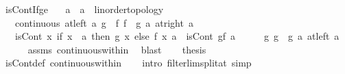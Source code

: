 \begin{isabellebody}
%
\endisadelimproof
%
\isadelimdocument
%
\endisadelimdocument
%
\isatagdocument
%
\isamarkuptrue%
%
\endisatagdocument
{\isafolddocument}%
%
\isadelimdocument
%
\endisadelimdocument
{}\isamarkupfalse%
\ isCont{\isacharunderscore}{\kern0pt}If{\isacharunderscore}{\kern0pt}ge{\isacharcolon}{\kern0pt}\isanewline
\ \ \ a\ {\isacharcolon}{\kern0pt}{\isacharcolon}{\kern0pt}\ {\isachardoublequoteopen}{\isacharprime}{\kern0pt}a\ {\isacharcolon}{\kern0pt}{\isacharcolon}{\kern0pt}\ linorder{\isacharunderscore}{\kern0pt}topology{\isachardoublequoteclose}\isanewline
\ \ \ {\isachardoublequoteopen}continuous\ {\isacharparenleft}{\kern0pt}at{\isacharunderscore}{\kern0pt}left\ a{\isacharparenright}{\kern0pt}\ g{\isachardoublequoteclose}\ \ f{\isacharcolon}{\kern0pt}\ {\isachardoublequoteopen}{\isacharparenleft}{\kern0pt}f\ {\isasymlonglongrightarrow}\ g\ a{\isacharparenright}{\kern0pt}\ {\isacharparenleft}{\kern0pt}at{\isacharunderscore}{\kern0pt}right\ a{\isacharparenright}{\kern0pt}{\isachardoublequoteclose}\isanewline
\ \ \ {\isachardoublequoteopen}isCont\ {\isacharparenleft}{\kern0pt}{\isasymlambda}x{\isachardot}{\kern0pt}\ if\ x\ {\isasymle}\ a\ then\ g\ x\ else\ f\ x{\isacharparenright}{\kern0pt}\ a{\isachardoublequoteclose}\ {\isacharparenleft}{\kern0pt}\ {\isachardoublequoteopen}isCont\ {\isacharquery}{\kern0pt}gf\ a{\isachardoublequoteclose}{\isacharparenright}{\kern0pt}\isanewline
%
\isadelimproof
%
\endisadelimproof
%
\isatagproof
{}\isamarkupfalse%
\ {\isacharminus}{\kern0pt}\isanewline
\ \ \isamarkupfalse%
\ g{\isacharcolon}{\kern0pt}\ {\isachardoublequoteopen}{\isacharparenleft}{\kern0pt}g\ {\isasymlonglongrightarrow}\ g\ a{\isacharparenright}{\kern0pt}\ {\isacharparenleft}{\kern0pt}at{\isacharunderscore}{\kern0pt}left\ a{\isacharparenright}{\kern0pt}{\isachardoublequoteclose}\isanewline
\ \ \ \ \isamarkupfalse%
\ assms\ continuous{\isacharunderscore}{\kern0pt}within\ \isamarkupfalse%
\ blast\isanewline
\ \ \isamarkupfalse%
\ {\isacharquery}{\kern0pt}thesis\isanewline
\ \ \ \ \isamarkupfalse%
\ isCont{\isacharunderscore}{\kern0pt}def\ continuous{\isacharunderscore}{\kern0pt}within\isanewline
\ \ \isamarkupfalse%
\ {\isacharparenleft}{\kern0pt}intro\ filterlim{\isacharunderscore}{\kern0pt}split{\isacharunderscore}{\kern0pt}at{\isacharsemicolon}{\kern0pt}\ simp{\isacharparenright}{\kern0pt}\isanewline

\end{isabellebody}
